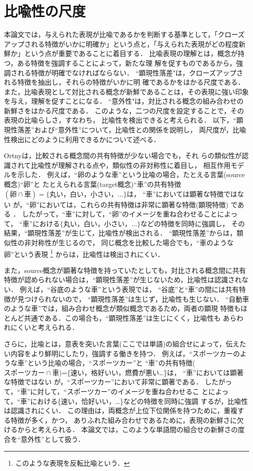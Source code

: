 \section{比喩性の尺度}
本論文では，与えられた表現が比喩であるかを判断する基準として，「クローズ
アップされる特徴がいかに明確か」という点と，「与えられた表現がどの程度新
鮮か」という点が重要であることに着目する．
比喩表現の理解とは，概念が持つ，ある特徴を強調することによって，新たな理
解を促すものであるから，強調される特徴が明確でなければならない．
``顕現性落差"は，クローズアップされる特徴を抽出し，それらの特徴がいかに明
確であるかをはかる尺度である．
また，比喩表現として対比される概念が新鮮であることは，その表現に強い印象
を与え，理解を促すことになる．
``意外性"は，対比される概念の組み合わせの新鮮さをはかる尺度である．
このような，二つの尺度を設定することで，その表現の比喩らしさ，すなわち，
比喩性を検出できると考えられる．
以下，``顕現性落差''および``意外性''について，比喩性との関係を説明し，
両尺度が，比喩性検出にどのように利用できるかについて述べる．

Ortny\cite{ortony79}は，比較される概念間の共有特徴が少ない場合でも，それ
らの類似性が認識されて比喩性が理解される点や，類似性の非対称性に着目し，
相互作用モデルを示した．
例えば，``卵のような車''という比喩の場合，たとえる言葉(source概念)``卵''と
たとえられる言葉(target概念)``車''の共有特徴
$(卵{\cap}車)=\{丸い，白い，小さい，…\}$は，
``車''においては顕著な特徴ではない
が，``卵''においては，これらの共有特徴は非常に顕著な特徴(顕現特徴)
である
．
したがって，``車''に対して，``卵''のイメージを重ね合わせることによって，
``車''における$\{丸い，白い，小さい，…\}$などの特徴を同時に強調し，
その結果，``顕現性落差''が生じて，比喩性が検出される．
``顕現性落差''からは，類似性の非対称性が生じるので，
同じ概念を比較した場合でも，``車のような卵''という表現
\footnote{このような表現を反転比喩という．}
からは，比喩性は検出されにくい．

また，source概念が顕著な特徴を持っていたとしても，対比される概念間に共有
特徴が認められない場合は，``顕現性落差''が生じないため，比喩性は認識されない．
例えば，``谷底のような車''という表現では，
``谷底''と``車''の間には共有特徴が見つけられないので，
``顕現性落差''は生じず，比喩性も生じない．
``自動車のような車''では，組み合わせ概念が類似概念であるため，両者の顕現
特徴もほとんど共通である．この場合も，``顕現性落差''は生じにくく，比喩性も
あらわれにくいと考えられる．

さらに，比喩とは，意表を突いた言葉(ここでは単語)の組合せによって，伝えた
い内容をより鮮明にしたり，強調する働きを持つ．
例えば，``スポーツカーのような車''という比喩の場合，``スポーツカー''と
``車''の共有特徴($スポーツカー{\cap}車$)=\{速い，格好いい，燃費が悪い…\}は，
``車''においては顕著な特徴ではない
が，``スポーツカー''において非常に顕著である．
したがって，``車''に対して，``スポーツカー''のイメージを重ね合わせるこ
とによって，``車''における\{速い，恰好いい，…\}などの特徴を同時に強調
するが，比喩性は認識されにくい．
この理由は，両概念が上位下位関係を持つために，重複する特徴が多く，かつ，
ありふれた組み合わせであるために，表現の新鮮さに欠けるからと考えられる．
本論文では，このような単語間の組合せの新鮮さの度合を``意外性''として扱う．

